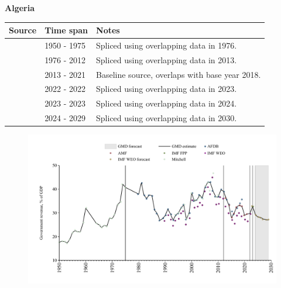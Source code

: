 \documentclass[12pt,a4paper,landscape]{article}
\begin{document}
\begin{adjustbox}{max totalsize={\paperwidth}{\paperheight},center}
\begin{minipage}[t][\textheight][t]{\textwidth}
\vspace*{0.5cm}
{}
\begin{center}
{\Large\bfseries Algeria}
\end{center}
\vspace{0.5cm}
\begin{table}[H]
\centering
\small
\begin{tabular}{|l|l|l|}
\hline
\textbf{Source} & \textbf{Time span} & \textbf{Notes} \\
\hline
\rowcolor{white}\cite{Mitchell}& 1950 - 1975 &Spliced using overlapping data in 1976.\\
\rowcolor{lightgray}\cite{AFDB}& 1976 - 2012 &Spliced using overlapping data in 2013.\\
\rowcolor{white}\cite{AMF}& 2013 - 2021 &Baseline source, overlaps with base year 2018.\\
\rowcolor{lightgray}\cite{IMF_WEO}& 2022 - 2022 &Spliced using overlapping data in 2023.\\
\rowcolor{white}\cite{IMF_FPP}& 2023 - 2023 &Spliced using overlapping data in 2024.\\
\rowcolor{lightgray}\cite{IMF_WEO_forecast}& 2024 - 2029 &Spliced using overlapping data in 2030.\\
\hline
\end{tabular}
\end{table}
\begin{figure}[H]
\centering
\includegraphics[width=\textwidth,height=0.6\textheight,keepaspectratio]{graphs/DZA_govrev_GDP.pdf}
\end{figure}
\end{minipage}
\end{adjustbox}
\end{document}

